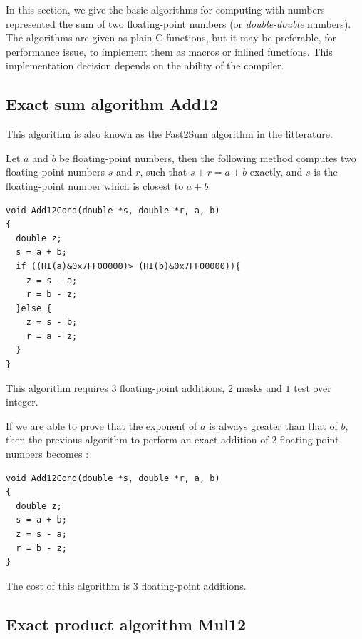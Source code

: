 In this section, we give the basic algorithms for computing with
numbers represented the sum of two floating-point numbers (or
\emph{double-double} numbers). The algorithms are given as plain C
functions, but it may be preferable, for performance issue, to
implement them as macros or inlined functions. This implementation
decision depends on the ability of the compiler.


\subsection{Exact sum algorithm {Add12}}

This algorithm is also known as the Fast2Sum algorithm in the litterature.
\begin{theorem}
  Let $a$ and $b$ be floating-point numbers, then the following method
  computes two floating-point numbers $s$ and $r$, such that $s+r =
  a+b$ exactly, and $s$ is the floating-point number which is closest
  to $a+b$.

\begin{lstlisting}[label={lst:Add12Cond},caption={Add12Cond},firstnumber=1]
void Add12Cond(double *s, double *r, a, b) 
{
  double z;
  s = a + b;            
  if ((HI(a)&0x7FF00000)> (HI(b)&0x7FF00000)){  
    z = s - a;           
    r = b - z;           
  }else {                 
    z = s - b;           
    r = a - z;           
  } 
}                         
\end{lstlisting}
This algorithm requires $3$ floating-point additions, $2$ masks and $1$ test over integer.
\end{theorem}


If we are able to prove that  the exponent of $a$ is always greater than that
of $b$, then the previous algorithm to perform an exact addition of 2
floating-point numbers becomes :
\begin{lstlisting}[label={lst:Add12},caption={Add12},firstnumber=1]
void Add12Cond(double *s, double *r, a, b) 
{
  double z;
  s = a + b;            
  z = s - a;  
  r = b - z; 
}            
\end{lstlisting}
The cost of this algorithm is $3$ floating-point additions.






\subsection{Exact product algorithm {Mul12}}

